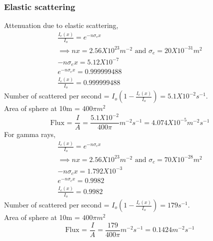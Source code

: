 \documentclass[11pt, a4paper]{article}
\begin{document}
\subsubsection*{Elastic scattering}
Attenuation due to elastic scattering,
\begin{gather}
    \frac{I_e(x)}{I_{o} } = e^{-n\sigma_{e}x}\\
    \implies nx = 2.56X10^{23}m^{-2} \text{ and } \sigma_e = 20 X 10^{-31}m^2 \\
    -n\sigma_{e}x = 5.12X10^{-7} \\
    e^{-n\sigma_{e}x }  = 0.999999488\\
    \frac{I_e(x)}{I_{o} }=0.999999488
\end{gather}
Number of scattered per second = \(I_{o} (1-\frac{I_e(x)}{I_{o} }) = 5.1X10^{-2} s^{-1} \). \\
Area of sphere at 10m = \(400 \pi m^2\) \\
\begin{equation}
    \boxed{\text{Flux = } \frac{I}{A} = \frac{5.1X10^{-2}}{400 \pi}m^{-2}s^{-1}  = 4.074X10^{-5}m^{-2}s^{-1} }
\end{equation}
For gamma rays,
\begin{gather}
    \frac{I_c(x)}{I_{o} } = e^{-n\sigma_{c}x}\\
    \implies nx = 2.56X10^{23}m^{-2} \text{ and } \sigma_c = 70 X 10^{-28}m^2 \\
    -n\sigma_{c}x = 1.792X10^{-3} \\
    e^{-n\sigma_{c}x }  = 0.9982\\
    \frac{I_{c} (x)}{I_{o} }=0.9982
\end{gather}
Number of scattered per second = \(I_{o} (1-\frac{I_c(x)}{I_{o} }) = 179 s^{-1} \). \\
Area of sphere at 10m = \(400 \pi m^2\) \\
\begin{equation}
    \boxed{\text{Flux = } \frac{I}{A} = \frac{179}{400 \pi}m^{-2}s^{-1}  = 0.1424m^{-2}s^{-1} }
\end{equation}
\end{document}
